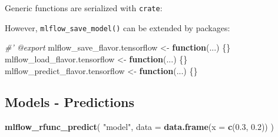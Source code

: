 \documentclass[]{article}
\newenvironment{Shaded}{\begin{snugshade}}{\end{snugshade}}
\newcommand{\CommentTok}[1]{\textcolor[rgb]{0.56,0.35,0.01}{\textit{#1}}}
\newcommand{\ControlFlowTok}[1]{\textcolor[rgb]{0.13,0.29,0.53}{\textbf{#1}}}
\newcommand{\DataTypeTok}[1]{\textcolor[rgb]{0.13,0.29,0.53}{#1}}
\newcommand{\DecValTok}[1]{\textcolor[rgb]{0.00,0.00,0.81}{#1}}
\newcommand{\FloatTok}[1]{\textcolor[rgb]{0.00,0.00,0.81}{#1}}
\newcommand{\KeywordTok}[1]{\textcolor[rgb]{0.13,0.29,0.53}{\textbf{#1}}}
\newcommand{\NormalTok}[1]{#1}
\newcommand{\OperatorTok}[1]{\textcolor[rgb]{0.81,0.36,0.00}{\textbf{#1}}}
\newcommand{\StringTok}[1]{\textcolor[rgb]{0.31,0.60,0.02}{#1}}
\begin{document}
Generic functions are serialized with \texttt{crate}:

\begin{Shaded}
\end{Shaded}

However, \texttt{mlflow\_save\_model()} can be extended by packages:

\begin{Shaded}
\begin{Highlighting}[]
\CommentTok{#' @export}
\NormalTok{mlflow_save_flavor.tensorflow <-}\StringTok{ }\ControlFlowTok{function}\NormalTok{(...) \{\}}
\NormalTok{mlflow_load_flavor.tensorflow <-}\StringTok{ }\ControlFlowTok{function}\NormalTok{(...) \{\}}
\NormalTok{mlflow_predict_flavor.tensorflow <-}\StringTok{ }\ControlFlowTok{function}\NormalTok{(...) \{\}}
\end{Highlighting}
\end{Shaded}

\hypertarget{models---predictions}{%
\subsection{Models - Predictions}\label{models---predictions}}

\begin{Shaded}
\begin{Highlighting}[]
\KeywordTok{mlflow_rfunc_predict}\NormalTok{(}
  \StringTok{"model"}\NormalTok{,}
  \DataTypeTok{data =} \KeywordTok{data.frame}\NormalTok{(}\DataTypeTok{x =} \KeywordTok{c}\NormalTok{(}\FloatTok{0.3}\NormalTok{, }\FloatTok{0.2}\NormalTok{))}
\NormalTok{)}
\end{Highlighting}
\end{Shaded}
\end{document}
